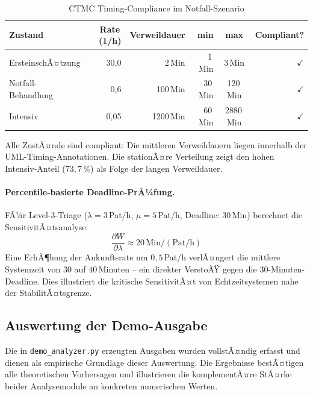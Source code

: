 ﻿\documentclass[a4paper,12pt]{scrreprt}
\theoremstyle{definition}
\begin{document}
\begin{table}[H]
	\centering
	\begin{tabular}{@{}lrrrcr@{}}
		\toprule
		\textbf{Zustand} & \textbf{Rate}\,(1/h) & \textbf{Verweildauer} &
		\textbf{min} & \textbf{max} & \textbf{Compliant?} \\
		\midrule
		ErsteinschÃ¤tzung  &  30{,}0 &  2\,Min &  1\,Min &   3\,Min & $\checkmark$ \\
		Notfall-Behandlung &  0{,}6 & 100\,Min & 30\,Min & 120\,Min & $\checkmark$ \\
		Intensiv           & 0{,}05 & 1200\,Min & 60\,Min & 2880\,Min& $\checkmark$ \\
		\bottomrule
	\end{tabular}
	\caption{CTMC Timing-Compliance im Notfall-Szenario}
	\label{tab:ctmc-compliance}
\end{table}

Alle ZustÃ¤nde sind compliant: Die mittleren Verweildauern liegen innerhalb
der UML-Timing-Annotationen. Die stationÃ¤re Verteilung zeigt den hohen
Intensiv-Anteil ($73{,}7\,\%$) als Folge der langen Verweildauer.

\paragraph{Percentile-basierte Deadline-PrÃ¼fung.}
FÃ¼r Level-3-Triage ($\lambda = 3$\,Pat/h, $\mu = 5$\,Pat/h,
Deadline: 30\,Min) berechnet die SensitivitÃ¤tsanalyse:
\begin{equation}
	\frac{\partial W}{\partial \lambda} \approx 20\,\text{Min}/(\text{Pat/h})
\end{equation}
Eine ErhÃ¶hung der Ankunftsrate um $0{,}5$\,Pat/h verlÃ¤ngert die
mittlere Systemzeit von $30$ auf $40$\,Minuten -- ein direkter VerstoÃŸ
gegen die 30-Minuten-Deadline. Dies illustriert die kritische SensitivitÃ¤t
von Echtzeitsystemen nahe der StabilitÃ¤tsgrenze.

\subsection{Auswertung der Demo-Ausgabe}
\label{sec:demo-auswertung}

Die in \texttt{demo\_analyzer.py} erzeugten Ausgaben wurden vollstÃ¤ndig
erfasst und dienen als empirische Grundlage dieser Auswertung. Die Ergebnisse
bestÃ¤tigen alle theoretischen Vorhersagen und illustrieren die komplementÃ¤re
StÃ¤rke beider Analysemodule an konkreten numerischen Werten.
\end{document}
